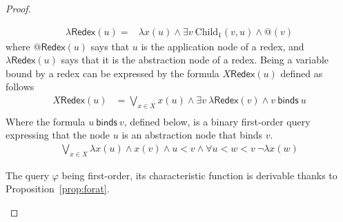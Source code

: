 \begin{proof}
\begin{enumerate}
$$\begin{array}{rl}
\lambda\mathsf{Redex}(u)=& \lambda x(u) \wedge \exists v \ \mathrm{Child}_1(v,u) \wedge @(v) 
\end{array}$$
where $@\mathsf{Redex}(u)$ says that $u$ is the application node of a redex, and $\lambda\mathsf{Redex}(u)$ says that it is the abstraction node of a redex. Being a variable bound by a redex can be expressed by the formula $X\mathsf{Redex}(u)$ defined as follows
\begin{align*}
X\mathsf{Redex}(u)&=\bigvee_{x\in X} x(u) \wedge \exists v\ \lambda\mathsf{Redex}(v) \wedge v\ \mathsf{binds}\ u\\
\end{align*}
Where the formula $u\ \mathsf{binds}\ v$, defined below,  is a binary first-order query expressing that the node $u$ is an abstraction node that binds $v$.
 \begin{align*}
 \bigvee_{x\in X} \lambda x(u) \wedge x(v) \wedge u<v\wedge \forall u<w<v\ \neg \lambda x(w)
 \end{align*}

The query $\varphi$ being first-order, its characteristic function is derivable thanks to Proposition~\ref{prop:forat}. 


\end{enumerate}
\end{proof}
